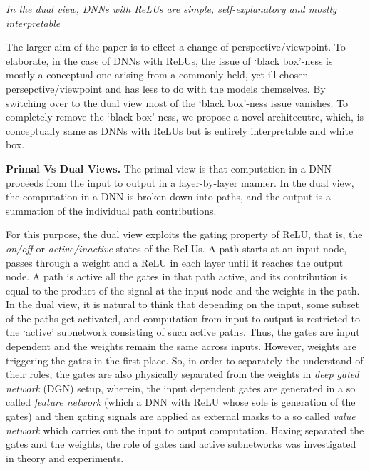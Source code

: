 \documentclass{article} %
\begin{document}
\begin{center}
\emph{In the dual view, DNNs with ReLUs are simple, self-explanatory and mostly interpretable}
\end{center}

The larger aim of the paper is to effect a change of perspective/viewpoint. To elaborate, in the case of DNNs with ReLUs, the issue of `black box'-ness is mostly a conceptual one arising from a commonly held, yet ill-chosen persepctive/viewpoint and has less to do with the models themselves. By switching over to the dual view most of the `black box'-ness issue vanishes. To completely remove the `black box'-ness, we propose a novel architecutre, which, is conceptually same as DNNs with ReLUs but is entirely interpretable and white box. 

\textbf{Primal Vs Dual Views.} The primal view is that computation in a DNN proceeds from the input to output in a layer-by-layer manner. In the dual view, the computation in a DNN is broken down into paths, and the output is a summation of the individual path contributions. 



For this purpose, the dual view exploits the gating property of ReLU, that is, the \emph{on/off} or \emph{active/inactive} states of the ReLUs. A path starts at an input node, passes through a weight and a ReLU in each layer until it reaches the output node. A path is active all the gates in that path active, and its contribution is equal to the product of the signal at the input node and the weights in the path. In the dual view, it is natural to think that depending on the input, some subset of the paths get activated, and computation from input to output is restricted to the `active' subnetwork consisting of such active paths. Thus, the gates are input dependent and the weights remain the same across inputs. However, weights are triggering the gates in the first place. So, in order to separately the understand of their roles, the gates are also physically separated from the weights in \emph{deep gated network} (DGN) setup, wherein, the input dependent gates are generated in a so called \emph{feature network} (which a DNN with ReLU whose sole  is  generation of the gates) and then gating signals are applied as external masks to a so called \emph{value network} which carries out the input to output computation. Having separated the gates and the weights, the role of gates and active subnetworks was investigated in theory and experiments.
\end{document}
